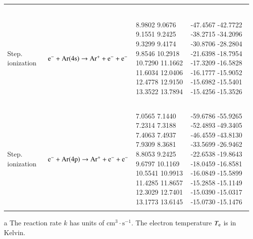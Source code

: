 \documentclass{warpdoc}
\newcommand{\alb}{\vspace{0.2cm}\\} %
\begin{document}
\begin{table}[!ht]
\begin{threeparttable}
\begin{tabular*}{\textwidth}{@{}l@{\extracolsep{\fill}}lll@{}}
\begin{minipage}[t]{0.28\textwidth}
\end{minipage} \\         
~\\


Step. ionization & ~{$\rm e^- + Ar(4s) \rightarrow Ar^+ + e^- + e^-$  } &   \begin{minipage}[t]{0.28\textwidth}\raggedright  
      8.9802
      9.0676
      9.1551
      9.2425
      9.3299
      9.4174
      9.8546
      10.2918
      10.7290
      11.1662
      11.6034
      12.0406
      12.4778
      12.9150
      13.3522
      13.7894
 \end{minipage}  & \begin{minipage}[t]{0.28\textwidth}\raggedright 
      -47.4567
      -42.7722
      -38.2715
      -34.2096
      -30.8706
      -28.2804
      -21.6398
      -18.7954
      -17.3209
      -16.5828
      -16.1777
      -15.9052
      -15.6982
      -15.5401
      -15.4256
      -15.3526
\end{minipage} \\ 
~\\

Step. ionization & ~{$\rm e^- + Ar(4p) \rightarrow Ar^+ + e^- + e^-$  } &   \begin{minipage}[t]{0.28\textwidth}\raggedright  
      7.0565
      7.1440
      7.2314
      7.3188
      7.4063
      7.4937
      7.9309
      8.3681
      8.8053
      9.2425
      9.6797
      10.1169
      10.5541
      10.9913
      11.4285
      11.8657
      12.3029
      12.7401
      13.1773
      13.6145
 \end{minipage}  & \begin{minipage}[t]{0.28\textwidth}\raggedright 
      -59.6786
      -55.9265
      -52.4893
      -49.3405
      -46.4559
      -43.8130
      -33.5699
      -26.9462
      -22.6538
      -19.8643
      -18.0459
      -16.8581
      -16.0849
      -15.5899
      -15.2858
      -15.1149
      -15.0390
      -15.0317
      -15.0730
      -15.1476
\end{minipage} \\ 
 \alb 
    \bottomrule
    \end{tabular*}
\begin{tablenotes}
\item[{a}] The reaction rate $k$ has units of $\textrm{cm}^3\cdot \textrm{s}^{-1}$. The electron temperature $T_{\rm e}$ is in Kelvin.

\end{tablenotes}
\label{tab:reactionratessplinecontrolpoints}
   \end{threeparttable}
\end{table}




 \clearpage


\end{document}
